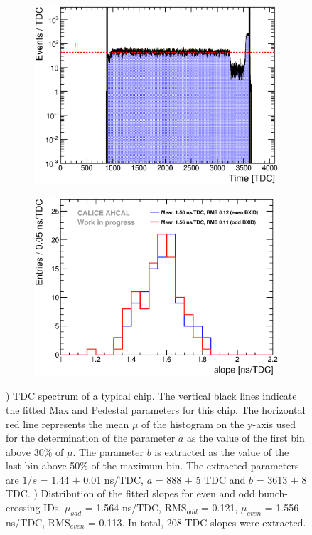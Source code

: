 \documentclass{JINST}
\begin{document}
\begin{figure}[htbp!]
  \begin{subfigure}[t]{0.49\textwidth}
    \centering
    \includegraphics[width=1\linewidth]{fig/ExampleTDCSpectra.eps}
    \caption{} \label{fig:TDC_Spectrum}
  \end{subfigure}
  \hfill
  \begin{subfigure}[t]{0.49\textwidth}
    \centering
    \includegraphics[width=1\linewidth]{fig/SlopesTDC.eps}
    \caption{} \label{fig:slopes}
  \end{subfigure}
  \caption{) TDC spectrum of a typical chip. The vertical black lines indicate the fitted Max and Pedestal parameters for this chip. The horizontal red line represents the mean $\mu$ of the histogram on the y-axis used for the determination of the parameter $a$ as the value of the first bin above 30\% of $\mu$. The parameter $b$ is extracted as the value of the last bin above 50\% of the maximum bin. The extracted parameters are $1/s$ = 1.44 $\pm$ 0.01 ns/TDC, $a$ = 888 $\pm$ 5 TDC and $b$ = 3613 $\pm$ 8 TDC. ) Distribution of the fitted slopes for even and odd bunch-crossing IDs. $\mu_{odd}$ = 1.564 ns/TDC, RMS$_{odd}$ = 0.121, $\mu_{even}$ = 1.556 ns/TDC, RMS$_{even}$ = 0.113. In total, 208 TDC slopes were extracted.}
\end{figure}
\end{document}

